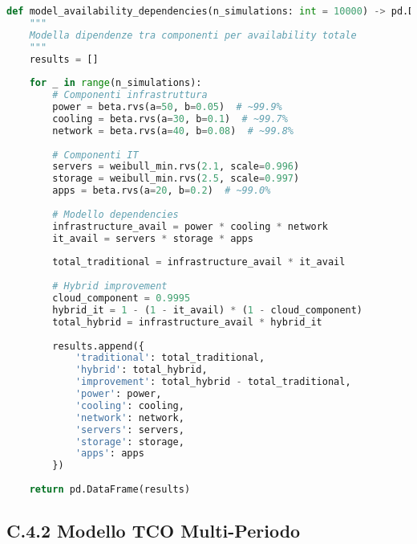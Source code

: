 \begin{lstlisting}[language=Python, caption=Modello di Disponibilità Bottom-Up]
def model_availability_dependencies(n_simulations: int = 10000) -> pd.DataFrame:
    """
    Modella dipendenze tra componenti per availability totale
    """
    results = []
    
    for _ in range(n_simulations):
        # Componenti infrastruttura
        power = beta.rvs(a=50, b=0.05)  # ~99.9%
        cooling = beta.rvs(a=30, b=0.1)  # ~99.7%
        network = beta.rvs(a=40, b=0.08)  # ~99.8%
        
        # Componenti IT
        servers = weibull_min.rvs(2.1, scale=0.996)
        storage = weibull_min.rvs(2.5, scale=0.997)
        apps = beta.rvs(a=20, b=0.2)  # ~99.0%
        
        # Modello dependencies
        infrastructure_avail = power * cooling * network
        it_avail = servers * storage * apps
        
        total_traditional = infrastructure_avail * it_avail
        
        # Hybrid improvement
        cloud_component = 0.9995
        hybrid_it = 1 - (1 - it_avail) * (1 - cloud_component)
        total_hybrid = infrastructure_avail * hybrid_it
        
        results.append({
            'traditional': total_traditional,
            'hybrid': total_hybrid,
            'improvement': total_hybrid - total_traditional,
            'power': power,
            'cooling': cooling,
            'network': network,
            'servers': servers,
            'storage': storage,
            'apps': apps
        })
    
    return pd.DataFrame(results)
\end{lstlisting}

\subsection{C.4.2 Modello TCO Multi-Periodo}

